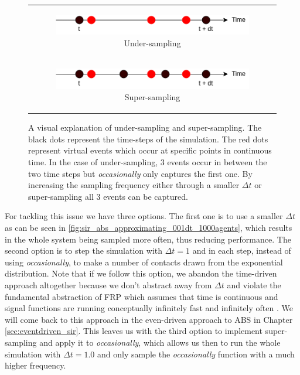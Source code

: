\begin{figure}
\begin{center}
	\begin{tabular}{c}
		\begin{subfigure}[b]{0.5\textwidth}
			\centering
			\includegraphics[width=1\textwidth, angle=0]{./fig/timedriven/undersampling.png}
			\caption{Under-sampling}
			\label{fig:undersampling}
		\end{subfigure}
		
		\\
		
		\begin{subfigure}[b]{0.5\textwidth}
			\centering
			\includegraphics[width=1\textwidth, angle=0]{./fig/timedriven/supersampling.png}
			\caption{Super-sampling}
			\label{fig:supersampling}
		\end{subfigure}
	\end{tabular}
	
	\caption{A visual explanation of under-sampling and super-sampling. The black dots represent the time-steps of the simulation. The red dots represent virtual events which occur at specific points in continuous time. In the case of under-sampling, 3 events occur in between the two time steps but \textit{occasionally} only captures the first one. By increasing the sampling frequency either through a smaller $\Delta t$ or super-sampling all 3 events can be captured.} 
	\label{fig:sampling_issue}
\end{center}
\end{figure}

For tackling this issue we have three options. The first one is to use a smaller $\Delta t$ as can be seen in \ref{fig:sir_abs_approximating_001dt_1000agents}, which results in the whole system being sampled more often, thus reducing performance. The second option is to step the simulation with $\Delta t = 1$ and in each step, instead of using \textit{occasionally}, to make a number of contacts drawn from the exponential distribution. Note that if we follow this option, we abandon the time-driven approach altogether because we don't abstract away from $\Delta t$ and violate the fundamental abstraction of FRP which assumes that time is continuous and signal functions are running conceptually infinitely fast and infinitely often \cite{winograd-cort_wormholes:_2012}. We will come back to this approach in the even-driven approach to ABS in Chapter \ref{sec:eventdriven_sir}. This leaves us with the third option to implement super-sampling and apply it to \textit{occasionally}, which allows us then to run the whole simulation with $\Delta t = 1.0$ and only sample the \textit{occasionally} function with a much higher frequency.

